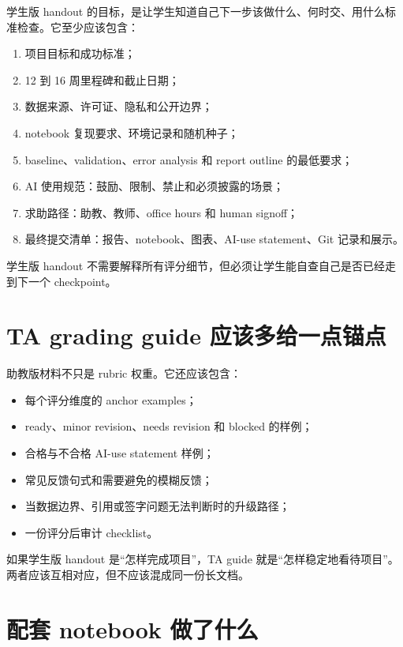 学生版 handout 的目标，是让学生知道自己下一步该做什么、何时交、用什么标准检查。它至少应该包含：

\begin{enumerate}
    \item 项目目标和成功标准；
    \item 12 到 16 周里程碑和截止日期；
    \item 数据来源、许可证、隐私和公开边界；
    \item notebook 复现要求、环境记录和随机种子；
    \item baseline、validation、error analysis 和 report outline 的最低要求；
    \item AI 使用规范：鼓励、限制、禁止和必须披露的场景；
    \item 求助路径：助教、教师、office hours 和 human signoff；
    \item 最终提交清单：报告、notebook、图表、AI-use statement、Git 记录和展示。
\end{enumerate}

学生版 handout 不需要解释所有评分细节，但必须让学生能自查自己是否已经走到下一个 checkpoint。

\section{TA grading guide 应该多给一点锚点}

助教版材料不只是 rubric 权重。它还应该包含：

\begin{itemize}
    \item 每个评分维度的 anchor examples；
    \item ready、minor revision、needs revision 和 blocked 的样例；
    \item 合格与不合格 AI-use statement 样例；
    \item 常见反馈句式和需要避免的模糊反馈；
    \item 当数据边界、引用或签字问题无法判断时的升级路径；
    \item 一份评分后审计 checklist。
\end{itemize}

如果学生版 handout 是“怎样完成项目”，TA guide 就是“怎样稳定地看待项目”。两者应该互相对应，但不应该混成同一份长文档。

\section{配套 notebook 做了什么}

